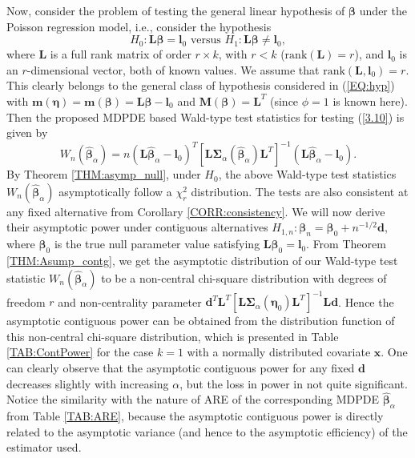 \documentclass[a4paper]{article}%
\begin{document}
Now, consider the problem of testing the general linear hypothesis of
$\boldsymbol{\beta}$ under the Poisson regression model, i.e., consider the
hypothesis
\begin{equation}
H_{0}:\boldsymbol{L}\boldsymbol{\beta}=\boldsymbol{l}_{0} \text{ versus }%
H_{1}:\boldsymbol{L}\boldsymbol{\beta}\neq\boldsymbol{l}_{0}, \label{3.10}%
\end{equation}
where $\boldsymbol{L}$ is a full rank matrix of order $r\times k$, with $r<k$
($\mathrm{rank}\left(  \boldsymbol{L}\right)  =r$), and $\boldsymbol{l}_{0}$
is an $r$-dimensional vector, both of known values. We assume that
$\mathrm{rank}\left(  \boldsymbol{L},\boldsymbol{l}_{0}\right)  =r$. This
clearly belongs to the general class of hypothesis considered in
(\ref{EQ:hyp}) with $\boldsymbol{m}(\boldsymbol{\eta}) = \boldsymbol{m}%
(\boldsymbol{\beta}) = \boldsymbol{L}\boldsymbol{\beta}-\boldsymbol{l}_{0}$
and $\boldsymbol{M}(\boldsymbol{\beta}) = \boldsymbol{L}^{T}$ (since $\phi=1$
is known here). Then the proposed MDPDE based Wald-type test statistics for
testing (\ref{3.10}) is given by
\begin{equation}
W_{n}(\widehat{\boldsymbol{\beta}}_{\alpha}) =n(\boldsymbol{L}%
\widehat{\boldsymbol{\beta}}_{\alpha}-\boldsymbol{l}_{0})^{T} \left[
\boldsymbol{L}\boldsymbol{\Sigma}_{\alpha}(\widehat{\boldsymbol{\beta}%
}_{\alpha})\boldsymbol{L}^{T}\right] ^{-1} (\boldsymbol{L}%
\widehat{\boldsymbol{\beta}}_{\alpha}-\boldsymbol{l}_{0}). \label{3.11}%
\end{equation}
By Theorem \ref{THM:asymp_null}, under $H_{0}$, the above Wald-type test statistics
$W_{n}(\widehat{\boldsymbol{\beta}}_{\alpha})$ asymptotically follow a 
$\chi_{r}^{2}$ distribution. The tests are also consistent at any fixed
alternative from Corollary \ref{CORR:consistency}. We will now derive their 
asymptotic power under contiguous alternatives $H_{1,n}: \boldsymbol{\beta
}_{n} = \boldsymbol{\beta}_{0} + n^{-1/2}\boldsymbol{d}$, where
$\boldsymbol{\beta}_{0}$ is the true null parameter value satisfying
$\boldsymbol{L}\boldsymbol{\beta}_{0}=\boldsymbol{l}_{0}$. From Theorem
\ref{THM:Asump_contg}, we get the asymptotic distribution of our Wald-type test
statistic $W_{n}(\widehat{\boldsymbol{\beta}}_{\alpha})$ to be a non-central
chi-square distribution with degrees of freedom $r$ and non-centrality
parameter $\boldsymbol{d}^{T}\boldsymbol{L}^{T} \left[ \boldsymbol{L}%
\boldsymbol{\Sigma}_{\alpha}(\boldsymbol{\eta}_{0})\boldsymbol{L}^{T}\right]
^{-1} \boldsymbol{L}\boldsymbol{d}$. Hence the asymptotic contiguous power can
be obtained from the distribution function of this non-central chi-square
distribution, which is presented in Table \ref{TAB:ContPower} for the case
$k=1$ with a normally distributed covariate $\boldsymbol{x}$. One can clearly
observe that the asymptotic contiguous power for any fixed $\boldsymbol{d}$
decreases slightly with increasing $\alpha$, but the loss in power in not
quite significant. Notice the similarity with the nature of ARE of the
corresponding MDPDE $\widehat{\boldsymbol{\beta}}_{\alpha}$ from Table
\ref{TAB:ARE}, because the asymptotic contiguous power is directly related to
the asymptotic variance (and hence to the asymptotic efficiency) of the
estimator used.
\end{document}
